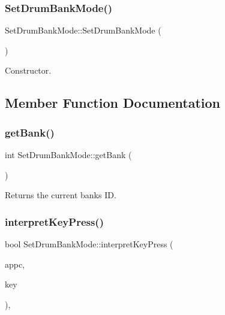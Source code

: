 \subsubsection{\texorpdfstring{Set\+Drum\+Bank\+Mode()}{SetDrumBankMode()}}
{\footnotesize\ttfamily Set\+Drum\+Bank\+Mode\+::\+Set\+Drum\+Bank\+Mode (\begin{DoxyParamCaption}{ }\end{DoxyParamCaption})}

Constructor. 

\subsection{Member Function Documentation}
\mbox{\label{classdrumpi_1_1SetDrumBankMode_aa3e8ece8e6a54e9d631d82d6f315f06a}} 
\subsubsection{\texorpdfstring{get\+Bank()}{getBank()}}
{\footnotesize\ttfamily int Set\+Drum\+Bank\+Mode\+::get\+Bank (\begin{DoxyParamCaption}{ }\end{DoxyParamCaption})}

Returns the current bank\textquotesingle{}s ID. \mbox{\label{classdrumpi_1_1SetDrumBankMode_a9b63a16aa08551a743c3751fa385c83b}} 
\subsubsection{\texorpdfstring{interpret\+Key\+Press()}{interpretKeyPress()}}
{\footnotesize\ttfamily bool Set\+Drum\+Bank\+Mode\+::interpret\+Key\+Press (\begin{DoxyParamCaption}\item[{\hyperlink{classdrumpi_1_1ApplicationCallback}{Application\+Callback} $\ast$}]{appc,  }\item[{int}]{key }\end{DoxyParamCaption})\hspace{0.3cm}{\ttfamily [override]}, {\ttfamily [virtual]}}



